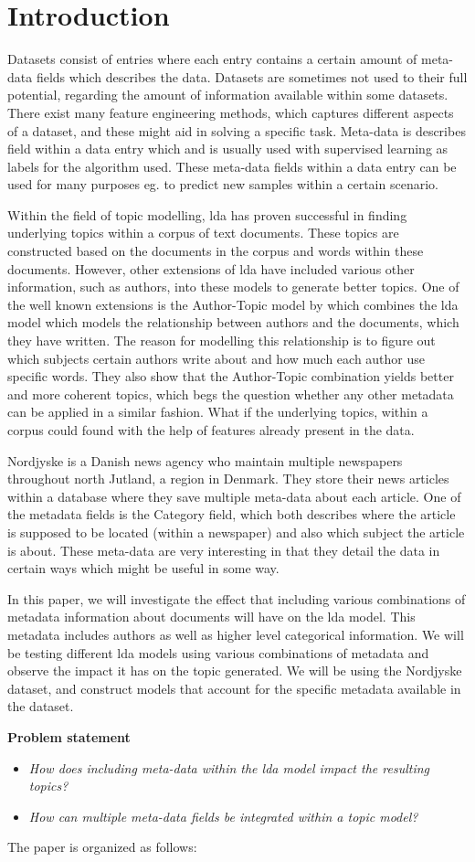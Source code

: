 \section{Introduction}\label{sec:introduction}
Datasets consist of entries where each entry contains a certain amount of meta-data fields which describes the data.
Datasets are sometimes not used to their full potential, regarding the amount of information available within some datasets.
There exist many feature engineering methods, which captures different aspects of a dataset, and these might aid in solving a specific task.
Meta-data is describes field within a data entry which and is usually used with supervised learning as labels for the algorithm used.
These meta-data fields within a data entry can be used for many purposes eg. to predict new samples within a certain scenario.

Within the field of topic modelling, \Gls{lda} has proven successful in finding underlying topics within a corpus of text documents.
These topics are constructed based on the documents in the corpus and words within these documents. 
However, other extensions of \gls{lda} have included various other information, such as authors, into these models to generate better topics.
One of the well known extensions is the Author-Topic model by \citet{author_topic} which combines the \gls{lda} model which models the relationship between authors and the documents, which they have written.
The reason for modelling this relationship is to figure out which subjects certain authors write about and how much each author use specific words. 
They also show that the Author-Topic combination yields better and more coherent topics, which begs the question whether any other metadata can be applied in a similar fashion.
What if the underlying topics, within a corpus could found with the help of features already present in the data.

Nordjyske is a Danish news agency who maintain multiple newspapers throughout north Jutland, a region in Denmark.
They store their news articles within a database where they save multiple meta-data about each article.
One of the metadata fields is the Category field, which both describes where the article is supposed to be located (within a newspaper) and also which subject the article is about.
These meta-data are very interesting in that they detail the data in certain ways which might be useful in some way.

In this paper, we will investigate the effect that including various combinations of metadata information about documents will have on the \gls{lda} model.
This metadata includes authors as well as higher level categorical information.
We will be testing different \gls{lda} models using various combinations of metadata and observe the impact it has on the topic generated.
We will be using the Nordjyske dataset, and construct models that account for the specific metadata available in the dataset.

\textbf{Problem statement}
\begin{itemize}
	\item \textit{How does including meta-data within the \gls{lda} model impact the resulting topics?}
	\item \textit{How can multiple meta-data fields be integrated within a topic model?}
\end{itemize}
	
The paper is organized as follows: 
